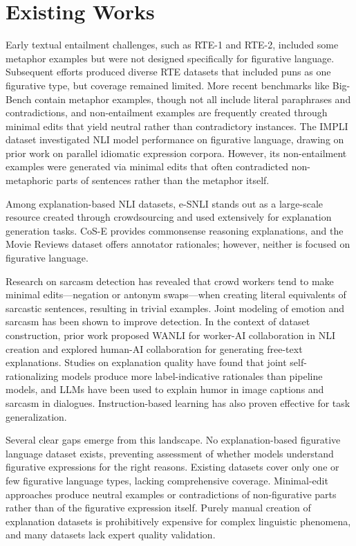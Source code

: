 \documentclass[12pt]{article}
\begin{document}
\section{Existing Works}

Early textual entailment challenges, such as RTE-1 and RTE-2, included some metaphor examples but were not designed specifically for figurative language. Subsequent efforts produced diverse RTE datasets that included puns as one figurative type, but coverage remained limited. More recent benchmarks like Big-Bench contain metaphor examples, though not all include literal paraphrases and contradictions, and non-entailment examples are frequently created through minimal edits that yield neutral rather than contradictory instances. The IMPLI dataset investigated NLI model performance on figurative language, drawing on prior work on parallel idiomatic expression corpora. However, its non-entailment examples were generated via minimal edits that often contradicted non-metaphoric parts of sentences rather than the metaphor itself.

Among explanation-based NLI datasets, e-SNLI stands out as a large-scale resource created through crowdsourcing and used extensively for explanation generation tasks. CoS-E provides commonsense reasoning explanations, and the Movie Reviews dataset offers annotator rationales; however, neither is focused on figurative language.

Research on sarcasm detection has revealed that crowd workers tend to make minimal edits---negation or antonym swaps---when creating literal equivalents of sarcastic sentences, resulting in trivial examples. Joint modeling of emotion and sarcasm has been shown to improve detection. In the context of dataset construction, prior work proposed WANLI for worker-AI collaboration in NLI creation and explored human-AI collaboration for generating free-text explanations. Studies on explanation quality have found that joint self-rationalizing models produce more label-indicative rationales than pipeline models, and LLMs have been used to explain humor in image captions and sarcasm in dialogues. Instruction-based learning has also proven effective for task generalization.

Several clear gaps emerge from this landscape. No explanation-based figurative language dataset exists, preventing assessment of whether models understand figurative expressions for the right reasons. Existing datasets cover only one or few figurative language types, lacking comprehensive coverage. Minimal-edit approaches produce neutral examples or contradictions of non-figurative parts rather than of the figurative expression itself. Purely manual creation of explanation datasets is prohibitively expensive for complex linguistic phenomena, and many datasets lack expert quality validation.
\end{document}
